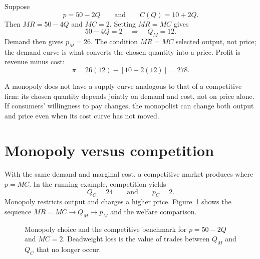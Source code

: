 Suppose
\[
p=50-2Q
\qquad\text{and}\qquad
C(Q)=10+2Q.
\]
Then $MR=50-4Q$ and $MC=2$. Setting $MR=MC$ gives
\[
50-4Q=2
\quad\Longrightarrow\quad
Q_M=12.
\]
Demand then gives $p_M=26$. The condition $MR=MC$ selected output, not price;
the demand curve is what converts the chosen quantity into a price. Profit is
revenue minus cost:
\[
\pi=26(12)-[10+2(12)]=278.
\]

A monopoly does not have a supply curve analogous to that of a competitive
firm: its chosen quantity depends jointly on demand and cost, not on price
alone. If consumers' willingness to pay changes, the monopolist can change
both output and price even when its cost curve has not moved.

\section{Monopoly versus competition}

With the same demand and marginal cost, a competitive market produces where
$p=MC$. In the running example, competition yields
\[
Q_C=24
\qquad\text{and}\qquad
p_C=2.
\]
Monopoly restricts output and charges a higher price. Figure~\ref{fig:monopoly-welfare}
shows the sequence $MR=MC\rightarrow Q_M\rightarrow p_M$ and the welfare
comparison.

\begin{figure}[htbp]
  \centering
  \caption{Monopoly choice and the competitive benchmark for
  $p=50-2Q$ and $MC=2$. Deadweight loss is the value of trades between
  $Q_M$ and $Q_C$ that no longer occur.}
  \label{fig:monopoly-welfare}
\end{figure}
\FloatBarrier

